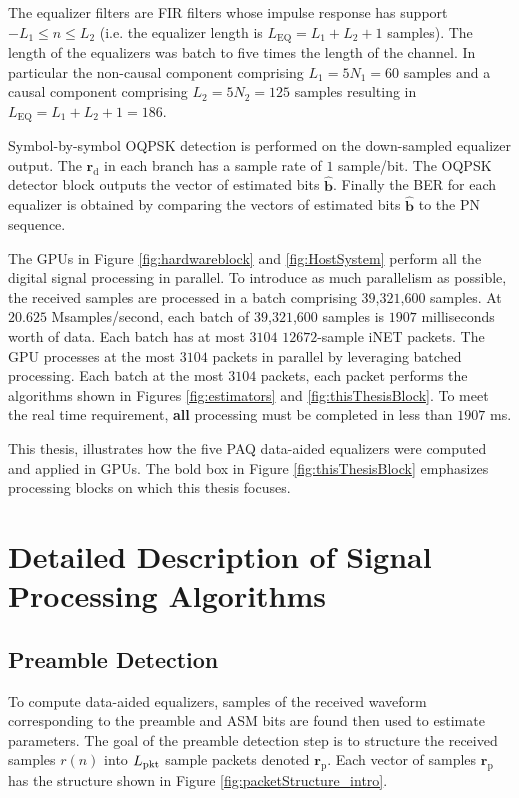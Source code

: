The equalizer filters are FIR filters whose impulse response has support $-L_1 \leq n \leq L_2$ (i.e. the equalizer length is $L_\text{EQ} = L_1+L_2+1$ samples).
The length of the equalizers was batch to five times the length of the channel.
In particular the non-causal component comprising $L_1 = 5N_1 = 60$ samples and a causal component comprising $L_2 = 5N_2 = 125$ samples resulting in $L_\text{EQ} = L_1+L_2+1 = 186$.

Symbol-by-symbol OQPSK detection \cite[app. (A)]{PAQ-phase1} is performed on the down-sampled equalizer output.
The $\mathbf{r}_\text{d}$ in each branch has a sample rate of $1$ sample/bit.
The OQPSK detector block outputs the vector of estimated bits $\hat{\mathbf{b}}$.
Finally the BER for each equalizer is obtained by comparing the vectors of estimated bits $\hat{\mathbf{b}}$ to the PN sequence.

The GPUs in Figure \ref{fig:hardwareblock} and \ref{fig:HostSystem} perform all the digital signal processing in parallel.
To introduce as much parallelism as possible, the received samples are processed in a batch comprising $39$,$321$,$600$ samples. 
At $20.625$ Msamples/second, each batch of $39$,$321$,$600$ samples is $1907$ milliseconds worth of data.
Each batch has at most $3104$ $12672$-sample iNET packets.
The GPU processes at the most $3104$ packets in parallel by leveraging batched processing.
Each batch at the most $3104$ packets, each packet performs the algorithms shown in Figures \ref{fig:estimators} and \ref{fig:thisThesisBlock}.
To meet the real time requirement, \textbf{all} processing must be completed in less than $1907$ ms.

This thesis, illustrates how the five PAQ data-aided equalizers were computed and applied in GPUs.
The bold box in Figure \ref{fig:thisThesisBlock} emphasizes processing blocks on which this thesis focuses.










\section{Detailed Description of Signal Processing Algorithms}
\subsection{Preamble Detection}
\label{sec:pd}
To compute data-aided equalizers, samples of the received waveform corresponding to the preamble and ASM bits are found then used to estimate parameters.
The goal of the preamble detection step is to structure the received samples $r(n)$ into $L_\text{pkt}$ sample packets denoted $\mathbf{r}_\text{p}$.
Each vector of samples $\mathbf{r}_\text{p}$ has the structure shown in Figure \ref{fig:packetStructure_intro}.

